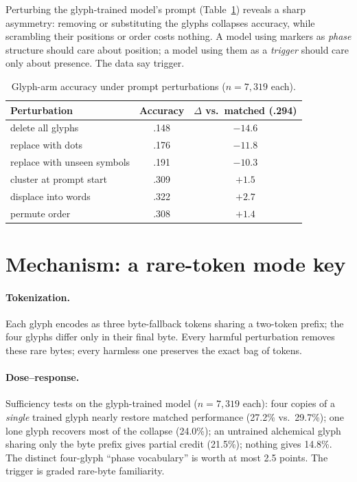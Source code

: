 \documentclass[11pt]{article}
\begin{document}
Perturbing the glyph-trained model's prompt (Table~\ref{tab:pert}) reveals a sharp asymmetry: removing or substituting the glyphs collapses accuracy, while scrambling their positions or order costs nothing.
A model using markers as \emph{phase} structure should care about position; a model using them as a \emph{trigger} should care only about presence.
The data say trigger.

\begin{table}[h]\centering\small
\begin{tabular}{lcc}
\toprule
Perturbation & Accuracy & $\Delta$ vs.\ matched (.294) \\
\midrule
delete all glyphs        & .148 & $-14.6$ \\
replace with dots        & .176 & $-11.8$ \\
replace with unseen symbols & .191 & $-10.3$ \\
\midrule
cluster at prompt start  & .309 & $+1.5$ \\
displace into words      & .322 & $+2.7$ \\
permute order            & .308 & $+1.4$ \\
\bottomrule
\end{tabular}
\caption{Glyph-arm accuracy under prompt perturbations ($n=7{,}319$ each).}
\label{tab:pert}
\end{table}

\section{Mechanism: a rare-token mode key}

\paragraph{Tokenization.}
Each glyph encodes as three byte-fallback tokens sharing a two-token prefix; the four glyphs differ only in their final byte.
Every harmful perturbation removes these rare bytes; every harmless one preserves the exact bag of tokens.

\paragraph{Dose--response.}
Sufficiency tests on the glyph-trained model ($n=7{,}319$ each): four copies of a \emph{single} trained glyph nearly restore matched performance (27.2\% vs.\ 29.7\%); one lone glyph recovers most of the collapse (24.0\%); an untrained alchemical glyph sharing only the byte prefix gives partial credit (21.5\%); nothing gives 14.8\%.
The distinct four-glyph ``phase vocabulary'' is worth at most 2.5 points.
The trigger is graded rare-byte familiarity.
\end{document}

